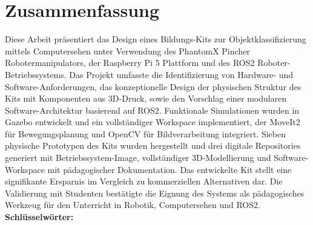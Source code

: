 \newpage 
\thispagestyle{empty}
\chapter*{\sffamily Zusammenfassung}
%
\begin{center}
\textbf{\large \thesisnamelang}
\end{center}
\par Diese Arbeit präsentiert das Design eines Bildungs-Kits zur Objektklassifizierung mittels Computersehen unter Verwendung des PhantomX Pincher Robotermanipulators, der Raspberry Pi 5 Plattform und des ROS2 Roboter-Betriebssystems. Das Projekt umfasste die Identifizierung von Hardware- und Software-Anforderungen, das konzeptionelle Design der physischen Struktur des Kits mit Komponenten aus 3D-Druck, sowie den Vorschlag einer modularen Software-Architektur basierend auf ROS2. Funktionale Simulationen wurden in Gazebo entwickelt und ein vollständiger Workspace implementiert, der MoveIt2 für Bewegungsplanung und OpenCV für Bildverarbeitung integriert. Sieben physische Prototypen des Kits wurden hergestellt und drei digitale Repositories generiert mit Betriebssystem-Image, vollständiger 3D-Modellierung und Software-Workspace mit pädagogischer Dokumentation. Das entwickelte Kit stellt eine signifikante Ersparnis im Vergleich zu kommerziellen Alternativen dar. Die Validierung mit Studenten bestätigte die Eignung des Systems als pädagogisches Werkzeug für den Unterricht in Robotik, Computersehen und ROS2.
\\[2cm]
\textbf{Schlüsselwörter:} \schlusselworter

